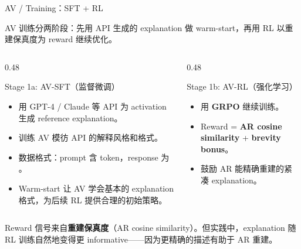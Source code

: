 \begin{frame}{AV / Training：SFT + RL}
\small

AV 训练分两阶段：先用 API 生成的 explanation 做 warm-start，再用 RL 以重建保真度为 reward 继续优化。

\begin{columns}[T,onlytextwidth]
\begin{column}{0.48\linewidth}
\begin{block}{Stage 1a: AV-SFT（监督微调）}
\begin{itemize}
  \item 用 GPT-4 / Claude 等 API 为 activation 生成 reference explanation。
  \item 训练 AV 模彷 API 的解释风格和格式。
  \item 数据格式：prompt 含  token，response 为 。
  \item Warm-start 让 AV 学会基本的 explanation 格式，为后续 RL 提供合理的初始策略。
\end{itemize}
\end{block}
\end{column}
\begin{column}{0.48\linewidth}
\begin{block}{Stage 1b: AV-RL（强化学习）}
\begin{itemize}
  \item 用 \textbf{GRPO} 继续训练。
  \item Reward = \textbf{AR cosine similarity} + \textbf{brevity bonus}。
  \item 鼓励 AR 能精确重建的紧凑 explanation。
\end{itemize}
\end{block}
\end{column}
\end{columns}

\vspace{0.5em}

Reward 信号来自\textbf{重建保真度}（AR cosine similarity）。但实践中，explanation 随 RL 训练自然地变得更 informative——因为更精确的描述有助于 AR 重建。

\end{frame}